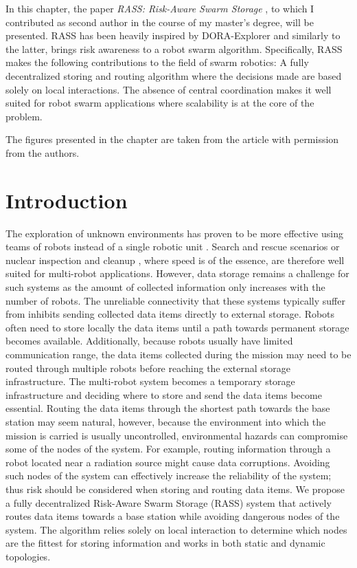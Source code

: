\label{sec:Theme2}

In this chapter, the paper \textit{RASS: Risk-Aware Swarm Storage} \cite{arseneault2022rass}, to which I contributed as second author in the course of my master's degree, will be presented. RASS has been heavily inspired by DORA-Explorer and similarly to the latter, brings risk awareness to a robot swarm algorithm. Specifically, RASS makes the following contributions to the field of swarm robotics: A fully decentralized storing and routing algorithm where the decisions made are based solely on local interactions. The absence of central coordination makes it well suited for robot swarm applications where scalability is at the core of the problem.

The figures presented in the chapter are taken from the article \cite{arseneault2022rass} with permission from the authors. 


\section{Introduction}
The exploration of unknown environments has proven to be more effective using teams of robots instead of a single robotic unit \cite{burgard2005coordinated}. Search and rescue scenarios \cite{kantor2003search} or nuclear inspection and cleanup \cite{schwagerMultirobotControlPolicy2017}, where speed is of the essence, are therefore well suited for multi-robot applications. However, data storage remains a challenge for such systems as the amount of collected information only increases with the number of robots. The unreliable connectivity that these systems typically suffer from \cite{amigoni2017multirobot} inhibits sending collected data items directly to external storage. Robots often need to store locally the data items until a path towards permanent storage becomes available. Additionally, because robots usually have limited communication range, the data items collected during the mission may need to be routed through multiple robots before reaching the external storage infrastructure. The multi-robot system becomes a temporary storage infrastructure and deciding where to store and send the data items become essential. Routing the data items through the shortest path towards the base station may seem natural, however, because the environment into which the mission is carried is usually uncontrolled, environmental hazards can compromise some of the nodes of the system. For example, routing information through a robot located near a radiation source might cause data corruptions. Avoiding such nodes of the system can effectively increase the reliability of the system; thus risk should be considered when storing and routing data items. We propose a fully decentralized Risk-Aware Swarm Storage (RASS) system that actively routes data items towards a base station while avoiding dangerous nodes of the system. The algorithm relies solely on local interaction to determine which nodes are the fittest for storing information and works in both static and dynamic topologies.


